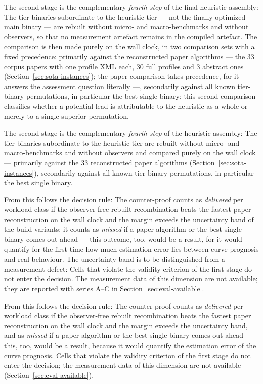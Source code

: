 \begin{nurlang}
The second stage is the complementary \emph{fourth step} of the final heuristic assembly: The tier
binaries subordinate to the heuristic tier --- not the finally optimized main binary --- are rebuilt
without micro- and macro-benchmarks and without observers, so that no measurement artefact remains in
the compiled artefact. The comparison is then made purely on the wall clock, in two comparison sets
with a fixed precedence: primarily against the reconstructed paper algorithms --- the 33 corpus
papers with one profile XML each, 30 full profiles and 3 abstract ones
(Section~\ref{sec:sota-instances}); the paper comparison takes precedence, for it answers the
assessment question literally ---, secondarily against all known tier-binary permutations, in
particular the best single binary; this second comparison classifies whether a potential lead is
attributable to the heuristic as a whole or merely to a single superior permutation.
\end{nurlang}
\begin{nurkurz}
The second stage is the complementary \emph{fourth step} of the heuristic assembly: The tier binaries
subordinate to the heuristic tier are rebuilt without micro- and macro-benchmarks and without observers and
compared purely on the wall clock --- primarily against the 33 reconstructed paper algorithms
(Section~\ref{sec:sota-instances}), secondarily against all known tier-binary permutations, in particular
the best single binary.
\end{nurkurz}

\begin{nurlang}
From this follows the decision rule: The counter-proof counts as \emph{delivered} per workload class
if the observer-free rebuilt recombination beats the fastest paper reconstruction on the wall clock
and the margin exceeds the uncertainty band of the build variants; it counts as \emph{missed} if a
paper algorithm or the best single binary comes out ahead --- this outcome, too, would be a result,
for it would quantify for the first time how much estimation error lies between curve prognosis and
real behaviour. The uncertainty band is to be distinguished from a measurement defect: Cells that
violate the validity criterion of the first stage do not enter the decision. The measurement data of
this dimension are not available; they are reported with series A--C in
Section~\ref{sec:eval-available}.
\end{nurlang}
\begin{nurkurz}
From this follows the decision rule: The counter-proof counts as \emph{delivered} per workload class if the
observer-free rebuilt recombination beats the fastest paper reconstruction on the wall clock and the margin
exceeds the uncertainty band, and as \emph{missed} if a paper algorithm or the best single binary comes out
ahead --- this, too, would be a result, because it would quantify the estimation error of the curve
prognosis. Cells that violate the validity criterion of the first stage do not enter the decision; the
measurement data of this dimension are not available (Section~\ref{sec:eval-available}).
\end{nurkurz}

